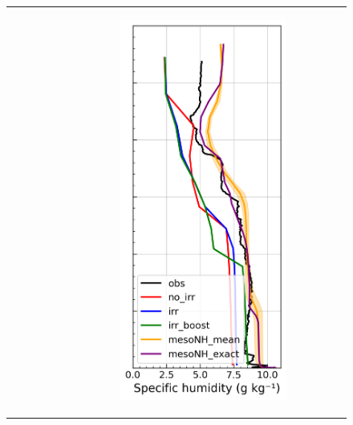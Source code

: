 \begin{figure}[hbtp]
{\begin{tabular}{@{}cccc@{}}
\begin{subfigure}[t]{0.382\textwidth}
        \end{subfigure} &
        \begin{subfigure}[t]{0.289\textwidth}
            \caption{}
            \includegraphics[width=\textwidth]{images/chap5/profiles/profile_cendrosa_ovap_2007_.png}

\end{subfigure}
\end{tabular}}
\end{figure}
